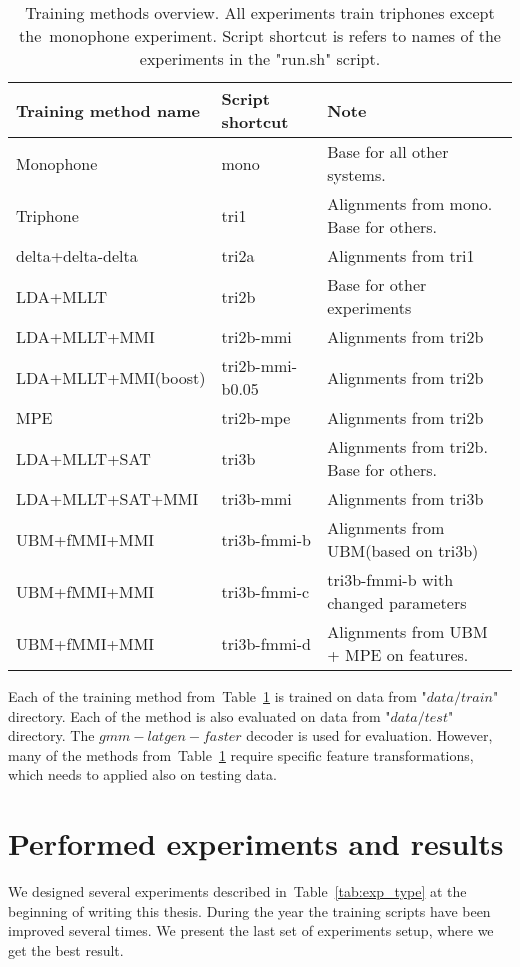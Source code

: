 \begin{table}[!htp]\label{tab:disc_train}
\small{\begin{tabular}{lll}
\hline
Training method name & Script shortcut & Note\\
\hline
Monophone & mono & Base for all other systems.\\
Triphone  & tri1 &  Alignments from mono. Base for others.\\
delta+delta-delta & tri2a & Alignments from tri1 \\
\ac{LDA}+\ac{MLLT} & tri2b &  Base for other experiments \\
\ac{LDA}+\ac{MLLT}+\ac{MMI} & tri2b-mmi & Alignments from tri2b \\
\ac{LDA}+\ac{MLLT}+\ac{MMI}(boost) & tri2b-mmi-b0.05  & Alignments from tri2b \\
\ac{MPE} & tri2b-mpe & Alignments from tri2b \\
\ac{LDA}+\ac{MLLT}+\ac{SAT} & tri3b & Alignments from tri2b. Base for others. \\
\ac{LDA}+\ac{MLLT}+\ac{SAT}+\ac{MMI} & tri3b-mmi  & Alignments from tri3b \\
\ac{UBM}+\ac{fMMI}+\ac{MMI} & tri3b-fmmi-b & Alignments from \ac{UBM}(based on tri3b) \\
\ac{UBM}+\ac{fMMI}+\ac{MMI} & tri3b-fmmi-c & tri3b-fmmi-b with changed parameters \\
\ac{UBM}+\ac{fMMI}+\ac{MMI} & tri3b-fmmi-d & Alignments from \ac{UBM} + \ac{MPE} on features.\\ 
\end{tabular}}
\caption{Training methods overview. All experiments train triphones except the~monophone experiment. Script shortcut is refers to names of the experiments in the "run.sh" script.}
\end{table}

Each of the training method from~Table~\ref{tab:disc_train} is trained on data from "$data/train$" directory.
Each of the method is also evaluated on data from "$data/test$" directory.
The $gmm-latgen-faster$ decoder is used for evaluation. 
However, many of the methods from~Table~\ref{tab:disc_train}
require specific feature transformations, which needs to applied also on testing data.

\section{Performed experiments and results} 
\label{sec:exps}
We designed several experiments described in~Table~\ref{tab:exp_type} at the beginning of writing this thesis.
During the year the training scripts have been improved several times. 
We present the last set of experiments setup, where we get the best result.

